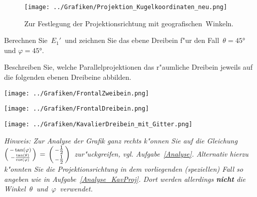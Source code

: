 \begin{Aufgabe}
\begin{figure}[ht]
  \centering
  \texttt{[image: ../Grafiken/Projektion\_Kugelkoordinaten\_neu.png]}
  \caption{Zur Festlegung der Projektionsrichtung mit \glqq geografischen\grqq\ Winkeln.}
  \label{Projektionsrichtung}
\end{figure}
\begin{Teilaufgaben}
\item Berechnen Sie\, $E_1'$\, und zeichnen Sie das ebene Dreibein f"ur den Fall\, $\theta = \ang{45}$\, und  $\varphi = \ang{45}$.
\item Beschreiben Sie, welche Parallelprojektionen das r"aumliche Dreibein jeweils auf die folgenden ebenen Dreibeine abbilden.
\end{Teilaufgaben}
\begin{minipage}{0.3\textwidth}
\texttt{[image: ../Grafiken/FrontalZweibein.png]}
\end{minipage}
\hspace{0.02\textwidth}
\begin{minipage}{0.3\textwidth}
\texttt{[image: ../Grafiken/FrontalDreibein.png]}
\end{minipage}
\hspace{0.02\textwidth}
\begin{minipage}{0.3\textwidth}
\texttt{[image: ../Grafiken/KavalierDreibein\_mit\_Gitter.png]}
\end{minipage}

\footnotesize%
\textit{Hinweis: Zur Analyse der Grafik ganz rechts k"onnen Sie auf die Gleichung\,  $\begin{psmallmatrix} - \tan(\varphi) \\ - \frac{\tan(\theta)}{\cos(\varphi)} \end{psmallmatrix}\, =\, \begin{psmallmatrix} -\tfrac{1}{2}\\ -\tfrac{1}{2}\end{psmallmatrix}$\, zur"uckgreifen, vgl. Aufgabe~\ref{Analyse}. Alternativ hierzu k"onnten Sie die Projektionsrichtung in dem vorliegenden (speziellen) Fall so angeben wie in Aufgabe~\ref{Analyse_KavProj}. Dort werden allerdings \textbf{nicht} die Winkel\, $\theta$\, und\, $\varphi$\, verwendet.}



\end{Aufgabe}
